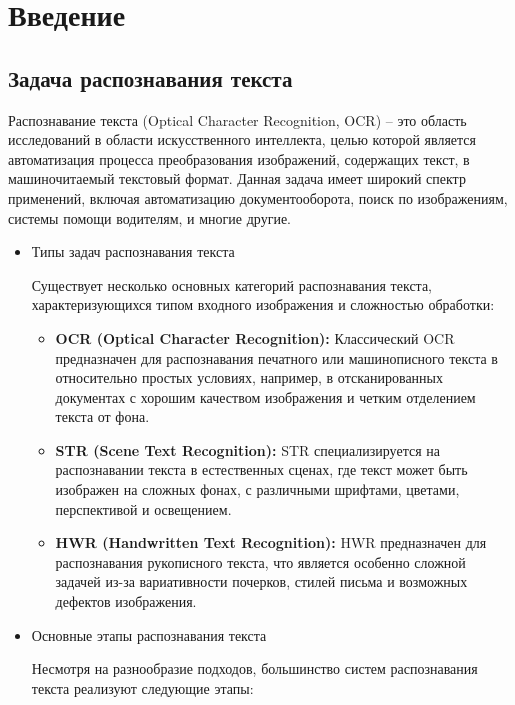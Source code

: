 \section{Введение}
\label{sec:Chapter0} 
\subsection{Задача распознавания текста}
Распознавание текста (Optical Character Recognition, OCR) -- это область исследований в области искусственного интеллекта, целью которой является автоматизация процесса преобразования изображений, содержащих текст, в машиночитаемый текстовый формат. Данная задача  имеет  широкий  спектр  применений,  включая  автоматизацию  документооборота,  поиск  по  изображениям,  системы  помощи  водителям,  и  многие  другие.
\begin{itemize}

    \item Типы задач распознавания текста

    Существует несколько основных категорий распознавания текста,  характеризующихся типом  входного  изображения  и  сложностью  обработки:

    \begin{itemize}
        \item \textbf{OCR (Optical Character Recognition):}  Классический  OCR  предназначен  для  распознавания  печатного  или  машинописного  текста  в  относительно  простых  условиях,  например,  в  отсканированных  документах  с  хорошим  качеством  изображения  и  четким  отделением  текста  от  фона. 
        \item \textbf{STR (Scene Text Recognition):}  STR  специализируется  на  распознавании  текста  в  естественных  сценах,  где  текст  может  быть  изображен  на  сложных  фонах,  с  различными  шрифтами,  цветами,  перспективой  и  освещением. 
        \item \textbf{HWR (Handwritten Text Recognition):}  HWR  предназначен  для  распознавания  рукописного  текста,  что  является  особенно  сложной  задачей  из-за  вариативности  почерков,  стилей  письма  и  возможных  дефектов  изображения. 
    \end{itemize}

    \item{Основные этапы распознавания текста}

    Несмотря  на  разнообразие  подходов,  большинство  систем  распознавания  текста  реализуют  следующие  этапы:


\end{itemize}
